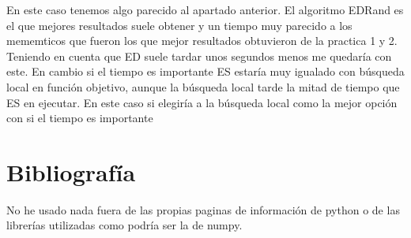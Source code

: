 \documentclass[titlepage]{article}
\begin{document}
	En este caso tenemos algo parecido al apartado anterior. El algoritmo EDRand es el que mejores resultados suele obtener y un tiempo muy parecido a los mememticos que fueron los que mejor resultados obtuvieron de la practica 1 y 2. Teniendo en cuenta que ED suele tardar unos segundos menos me quedaría con este. En cambio si el tiempo es importante ES estaría muy igualado con búsqueda local en función objetivo, aunque la búsqueda local tarde la mitad de tiempo que ES en ejecutar. En este caso si elegiría a  la búsqueda local como la mejor opción con si el tiempo es importante
	
	
	
	
	\section{Bibliografía}
	No he usado nada fuera de las propias paginas de información de python o de las librerías utilizadas como podría ser la de numpy.
	
	\
  
\end{document}
